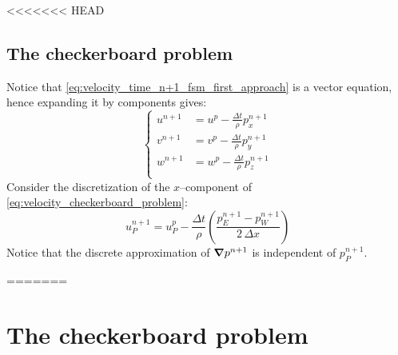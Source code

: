 <<<<<<< HEAD
\subsection{The checkerboard problem}

Notice that \eqref{eq:velocity_time_n+1_fsm_first_approach} is a vector equation, hence expanding it by components gives:
\begin{equation} \label{eq:velocity_checkerboard_problem}
    \left\{
        \begin{aligned}
            u^{n+1} &= u^p - \frac{\Delta t}{\rho} p_x^{n+1} \\
            v^{n+1} &= v^p - \frac{\Delta t}{\rho} p_y^{n+1} \\
            w^{n+1} &= w^p - \frac{\Delta t}{\rho} p_z^{n+1} \\
        \end{aligned}
    \right.
\end{equation}
Consider the discretization of the $x$--component of \eqref{eq:velocity_checkerboard_problem}:
\begin{equation}
    u_P^{n+1} = 
    u_P^p - \frac{\Delta t}{\rho} 
    \left( \frac{p_E^{n+1} - p_W^{n+1}}{2 \, \Delta x} \right)
\end{equation}
Notice that the discrete approximation of $\grad{p}^{n+1}$ is independent of $p_P^{n+1}$.

=======
\section{The checkerboard problem}

